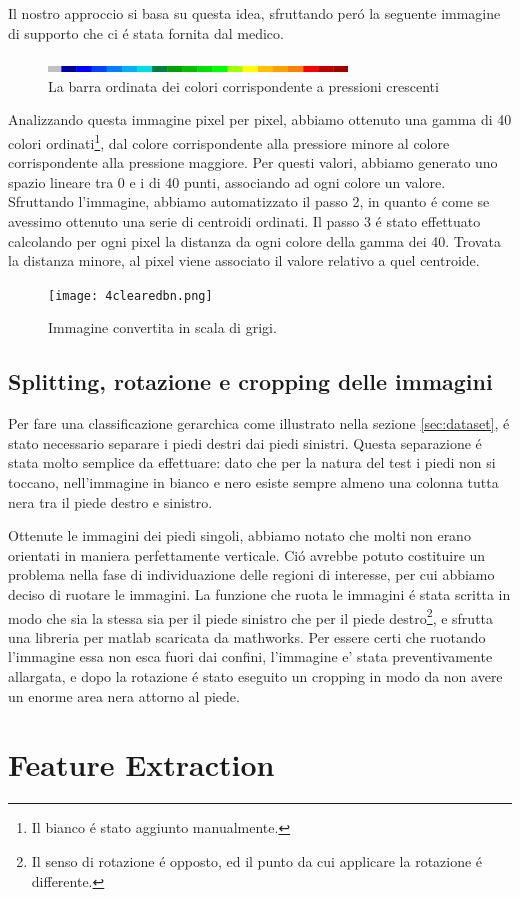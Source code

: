 \documentclass[11pt,twoside,a4paper]{article}
\begin{document}
Il nostro approccio si basa su questa idea, sfruttando per\'o la seguente immagine di supporto che ci \'e stata fornita dal medico.
\begin{figure}
\centering
\includegraphics[keepaspectratio, width=300px]{color.png}
\caption{La barra ordinata dei colori corrispondente a pressioni crescenti}
\end{figure}
Analizzando questa immagine pixel per pixel, abbiamo ottenuto una gamma di 40 colori ordinati\footnote{Il bianco \'e stato aggiunto manualmente.}, dal colore corrispondente alla pressiore minore al colore corrispondente alla pressione maggiore. Per questi valori, abbiamo generato uno spazio lineare tra 0 e i di 40 punti, associando ad ogni colore un valore. Sfruttando l'immagine, abbiamo automatizzato il passo 2, in quanto \'e come se avessimo ottenuto una serie di centroidi ordinati. Il passo 3 \'e stato effettuato calcolando per ogni pixel la distanza da ogni colore della gamma dei 40. Trovata la distanza minore, al pixel viene associato il valore relativo a quel centroide.

\begin{figure}
\centering
\texttt{[image: 4clearedbn.png]}
\caption{Immagine convertita in scala di grigi.}
\end{figure}




\subsection{Splitting, rotazione e cropping delle immagini}
\label{subsec:splitting}
Per fare una classificazione gerarchica come illustrato nella sezione \ref{sec:dataset}, \'e stato necessario separare i piedi destri dai piedi sinistri. Questa separazione \'e stata molto semplice da effettuare: dato che per la natura del test i piedi non si toccano, nell'immagine in bianco e nero esiste sempre almeno una colonna tutta nera tra il piede destro e sinistro. 



Ottenute le immagini dei piedi singoli, abbiamo notato che molti non erano orientati in maniera perfettamente verticale. Ci\'o avrebbe potuto costituire un problema nella fase di individuazione delle regioni di interesse, per cui abbiamo deciso di ruotare le immagini. La funzione che ruota le immagini \'e stata scritta in modo che sia la stessa sia per il piede sinistro che per il piede destro\footnote{Il senso di rotazione \'e opposto, ed il punto da cui applicare la rotazione \'e differente.}, e sfrutta una libreria per matlab scaricata da mathworks. Per essere certi che ruotando l'immagine essa non esca fuori dai confini, l'immagine e' stata preventivamente allargata, e dopo la rotazione \'e stato eseguito un cropping in modo da non avere un enorme area nera attorno al piede.
\section{Feature Extraction}

\label{sec:implementation}
\end{document}
